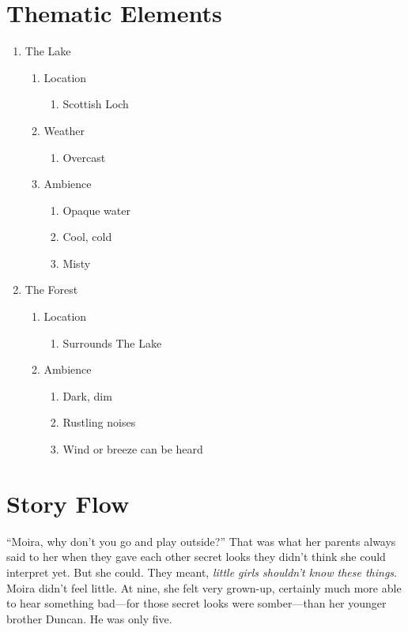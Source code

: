 \documentclass[letterpaper, twoside, 12pt]{memoir}
\begin{document}
\section{Thematic Elements}

\begin{enumerate}
\item The Lake
  \begin{enumerate}
  \item Location
    \begin{enumerate}
    \item Scottish Loch
    \end{enumerate}
  \item Weather
    \begin{enumerate}
    \item Overcast
    \end{enumerate}
  \item Ambience
    \begin{enumerate}
    \item Opaque water
    \item Cool, cold
    \item Misty
    \end{enumerate}
  \end{enumerate}
\item The Forest
  \begin{enumerate}
  \item Location
    \begin{enumerate}
    \item Surrounds The Lake
    \end{enumerate}
  \item Ambience
    \begin{enumerate}
    \item Dark, dim
    \item Rustling noises
    \item Wind or breeze can be heard
    \end{enumerate}
  \end{enumerate}
\end{enumerate}

\section{Story Flow}

“Moira, why don’t you go and play outside?”
That was what her parents always said to her when they gave each other secret looks they didn’t think she could interpret yet. But she could. They meant, \textit{little girls shouldn’t know these things}. Moira didn’t feel little. At nine, she felt very grown-up, certainly much more able to hear something bad---for those secret looks were somber---than her younger brother Duncan. He was only five.
\end{document}
